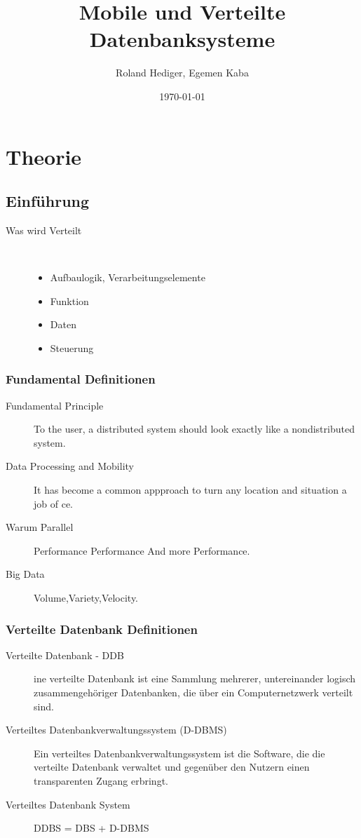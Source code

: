 \documentclass[a4paper,10pt,titlepage=false]{scrreprt}
\title{Mobile und Verteilte Datenbanksysteme}
\author{Roland Hediger, Egemen Kaba}
\date{\today}
\begin{document}
 \maketitle
 \tableofcontents
\pagestyle{fancy}
\part{Theorie} %
\label{prt:theorie_}
\chapter{Einführung}
\begin{description}
 \item [Was wird Verteilt] \hfill \\
 \begin{itemize}
  \item Aufbaulogik, Verarbeitungselemente 
  \item Funktion
  \item Daten
  \item Steuerung
 \end{itemize}
\end{description}
\section{Fundamental Definitionen}
\begin{description}
 \item [Fundamental Principle] To the user, a distributed system should look exactly like a nondistributed
system.
\item[Data Processing and Mobility] It has become a common appproach to turn any location and situation a job
of ce.
\item [Warum Parallel] 	Performance
Performance
And more Performance.
\item[Big Data] Volume,Variety,Velocity.
\end{description}

\section{Verteilte Datenbank Definitionen}
\begin{description}
 \item [Verteilte Datenbank - DDB] ine verteilte Datenbank ist eine Sammlung mehrerer,
untereinander logisch zusammengehöriger Datenbanken,
die über ein Computernetzwerk verteilt sind.
\item[Verteiltes Datenbankverwaltungssystem (D-DBMS)] Ein verteiltes Datenbankverwaltungssystem ist die
Software, die die verteilte Datenbank verwaltet und
gegenüber den Nutzern einen transparenten Zugang
erbringt.
\item[Verteiltes Datenbank System]DDBS = DBS + D-DBMS
\end{description}
\end{document}
